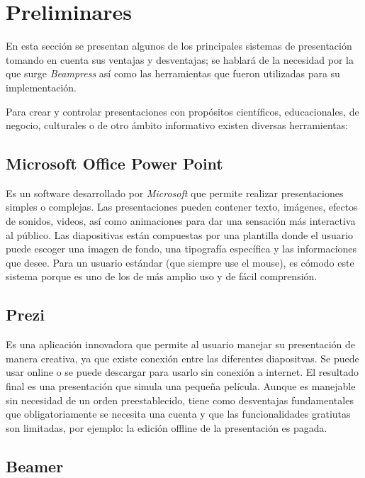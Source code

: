 \chapter{Preliminares} %
\label{cha:preliminares}
	En esta sección se presentan algunos de los principales sistemas de presentación tomando en cuenta sus ventajas y desventajas; se hablará de la necesidad por la que surge \textit{Beampress} así como las herramientas que fueron utilizadas para su implementación.


	Para crear y controlar presentaciones con propósitos científicos, educacionales, de negocio, culturales o de otro ámbito informativo existen diversas herramientas:	

	\section{Microsoft Office Power Point} %
	\label{sec:microsoft_office_power_point}

		Es un software desarrollado por \textit{Microsoft}  que permite realizar presentaciones simples o complejas. Las presentaciones pueden contener texto, imágenes, efectos de sonidos, videos, así como animaciones para dar una sensación más interactiva al público. Las diapositivas están compuestas por una plantilla donde el usuario puede escoger una imagen de fondo, una tipografía específica y las informaciones que desee. Para un usuario estándar (que siempre use el mouse), es cómodo este sistema porque es uno de los de más amplio uso y de fácil comprensión.


	\section{Prezi} %
	\label{sec:prezi}
		Es una aplicación innovadora que permite al usuario manejar su presentación de manera creativa, ya que existe conexión entre las diferentes diapositvas. Se puede usar online o se puede descargar para usarlo sin conexión a internet. El resultado final es una presentación que simula una pequeña película. Aunque es manejable sin necesidad de un orden preestablecido, tiene como desventajas fundamentales que obligatoriamente se necesita una cuenta y que las funcionalidades gratiutas son limitadas, por ejemplo: la edición offline de la presentación es pagada.		

	\section{Beamer} %
	\label{sec:beamer}

